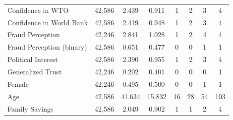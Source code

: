\documentclass[11pt, ngerman,english,a4]{article}
\begin{document}
\begin{table}[!htbp]
\begin{tabular}{@{\extracolsep{5pt}}lccccccc}
		Confidence in WTO              & 42,586                & 2.439                    & 0.911                        & 1                       & 2                        & 3                        & 4                       \\ 
		Confidence in World Bank       & 42,586                & 2.419                    & 0.948                        & 1                       & 2                        & 3                        & 4                       \\ 
		Fraud Perception               & 42,246                & 2.841                    & 1.028                        & 1                       & 2                        & 4                        & 4                       \\ 
		Fraud Perception (binary)      & 42,586                & 0.651                    & 0.477                        & 0                       & 0                        & 1                        & 1                       \\ 
		Political Interest             & 42,586                & 2.390                    & 0.955                        & 1                       & 2                        & 3                        & 4                       \\ 
		Generalized Trust              & 42,246                & 0.202                    & 0.401                        & 0                       & 0                        & 0                        & 1                       \\ 
		Female                         & 42,246                & 0.495                    & 0.500                        & 0                       & 0                        & 1                        & 1                       \\ 
		Age                            & 42,586                & 41.634                   & 15.832                       & 16                      & 28                       & 54                       & 103                     \\ 
		Family Savings                 & 42,586                & 2.049                    & 0.902                        & 1                       & 1                        & 2                        & 4                       \\ 

\end{tabular}
\end{table}
\end{document}

